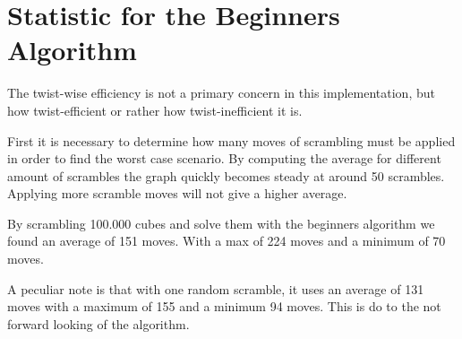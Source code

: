 \section{Statistic for the Beginners Algorithm}
The twist-wise efficiency is not a primary concern in this implementation, but how twist-efficient or rather how twist-inefficient it is. 

First it is necessary to determine how many moves of scrambling must be applied in order to find the worst case scenario. By computing the average for different amount of scrambles the graph quickly becomes steady at around 50 scrambles. Applying more scramble moves will not give a higher average. 

By scrambling 100.000 cubes and solve them with the beginners algorithm we found an average of 151 moves. With a max of 224 moves and a minimum of 70 moves. 

A peculiar note is that with one random scramble, it uses an average of 131 moves with a maximum of 155 and a minimum 94 moves. This is do to the not forward looking of the algorithm. 
